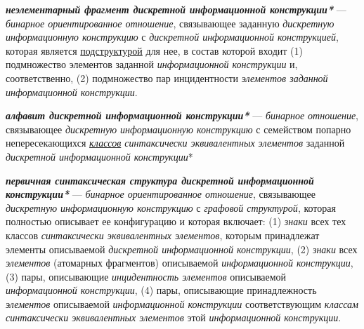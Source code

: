 \begin{SCn}


\end{SCn}

\textit{\textbf{неэлементарный фрагмент дискретной информационной конструкции*}} --- \textit{бинарное ориентированное отношение}, связывающее заданную \textit{дискретную информационную конструкцию} с \textit{дискретной информационной конструкцией}, которая является \underline{подструктурой} для нее, в состав которой входит (1) подмножество элементов заданной \textit{информационной конструкции} и, соответственно, (2) подмножество пар инцидентности \textit{элементов заданной информационной конструкции}.

\textit{\textbf{алфавит дискретной информационной конструкции*}} --- \textit{бинарное отношение}, связывающее \textit{дискретную информационную конструкцию} с семейством попарно непересекающихся \textit{\underline{классов} синтаксически эквивалентных элементов} заданной \textit{дискретной информационной конструкции}*

\textit{\textbf{первичная синтаксическая структура дискретной информационной конструкции*}} --- \textit{бинарное ориентированное отношение}, связывающее \textit{дискретную информационную конструкцию} с \textit{графовой структурой}, которая полностью описывает ее конфигурацию и которая включает: (1) \textit{знаки} всех тех классов \textit{синтаксически эквивалентных элементов}, которым принадлежат элементы описываемой \textit{дискретной информационной конструкции}, (2) \textit{знаки} всех \textit{элементов} (атомарных фрагментов) описываемой \textit{информационной конструкции}, (3) пары, описывающие \textit{инцидентность элементов} описываемой \textit{информационной конструкции}, (4) пары, описывающие принадлежность \textit{элементов} описываемой \textit{информационной конструкции} соответствующим \textit{классам синтаксически эквивалентных элементов} этой \textit{информационной конструкции}.

